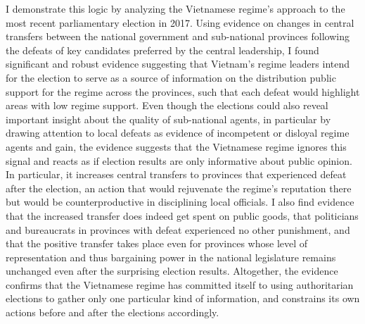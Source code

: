 \documentclass[12pt]{article}
\newcommand{\1}{\mathbbm{1}}
\begin{document}
I demonstrate this logic by analyzing the Vietnamese regime's approach to the most recent parliamentary election in 2017. Using evidence on changes in central transfers between the national government and sub-national provinces following the defeats of key candidates preferred by the central leadership, I found significant and robust evidence suggesting that Vietnam's regime leaders intend for the election to serve as a source of information on the distribution public support for the regime across the provinces, such that each defeat would highlight areas with low regime support. Even though the elections could also reveal important insight about the quality of sub-national agents, in particular by drawing attention to local defeats as evidence of incompetent or disloyal regime agents and gain, the evidence suggests that the Vietnamese regime ignores this signal and reacts as if election results are only informative about public opinion. In particular, it increases central transfers to provinces that experienced defeat after the election, an action that would rejuvenate the regime's reputation there but would be counterproductive in disciplining local officials. I also find evidence that the increased transfer does indeed get spent on public goods, that politicians and bureaucrats in provinces with defeat experienced no other punishment, and that the positive transfer takes place even for provinces whose level of representation and thus bargaining power in the national legislature remains unchanged even after the surprising election results. Altogether, the evidence confirms that the Vietnamese regime has committed itself to using authoritarian elections to gather only one particular kind of information, and constrains its own actions before and after the elections accordingly.
\end{document}
